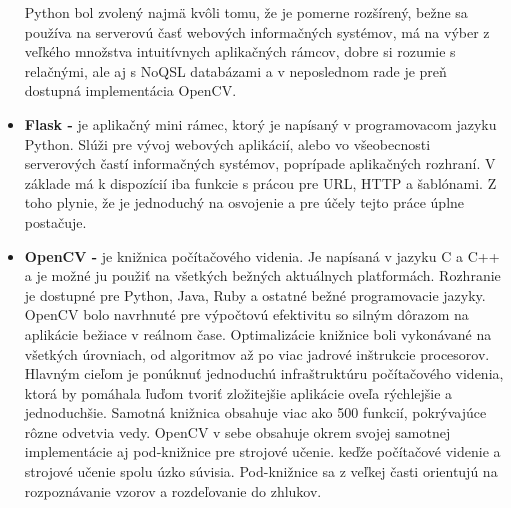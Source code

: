 \begin{itemize}
    Python bol zvolený najmä kvôli tomu, že je pomerne rozšírený, bežne sa používa na serverovú časť webových informačných systémov, má na výber z veľkého množstva intuitívnych aplikačných rámcov, dobre si rozumie s relačnými, ale aj s NoQSL databázami a v neposlednom rade je preň dostupná implementácia OpenCV.
    \item \textbf{Flask -} je aplikačný mini rámec, ktorý je napísaný v programovacom jazyku Python. Slúži pre vývoj webových aplikácií, alebo vo všeobecnosti serverových častí informačných systémov, poprípade aplikačných rozhraní. V základe má k dispozícií iba funkcie s prácou pre URL, HTTP a šablónami. Z toho plynie, že je jednoduchý na osvojenie a pre účely tejto práce úplne postačuje. \cite{YNlrXY2RKWca3gk8}
    \item \textbf{OpenCV -} je knižnica počítačového videnia. Je napísaná v jazyku C a C++ a je možné ju použiť na všetkých bežných aktuálnych platformách. Rozhranie je dostupné pre Python, Java, Ruby a ostatné bežné programovacie jazyky. OpenCV bolo navrhnuté pre výpočtovú efektivitu so silným dôrazom na aplikácie bežiace v reálnom čase. Optimalizácie knižnice boli vykonávané na všetkých úrovniach, od algoritmov až po viac jadrové inštrukcie procesorov. Hlavným cieľom je ponúknuť jednoduchú infraštruktúru počítačového videnia, ktorá by pomáhala ľuďom tvoriť zložitejšie aplikácie oveľa rýchlejšie a jednoduchšie. Samotná knižnica obsahuje viac ako 500 funkcií, pokrývajúce rôzne odvetvia vedy. OpenCV v sebe obsahuje okrem svojej samotnej implementácie aj pod-knižnice pre strojové učenie. keďže počítačové videnie a strojové učenie spolu úzko súvisia. Pod-knižnice sa z veľkej časti orientujú na rozpoznávanie vzorov a rozdeľovanie do zhlukov. \cite{Bradskic2008}
\end{itemize}